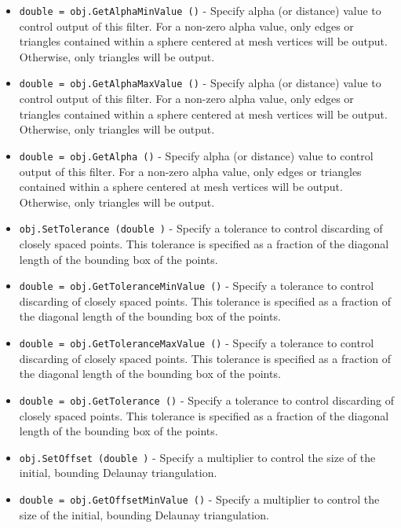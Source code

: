 \begin{itemize}
\item  \verb|double = obj.GetAlphaMinValue ()| -  Specify alpha (or distance) value to control output of this filter.
 For a non-zero alpha value, only edges or triangles contained within
 a sphere centered at mesh vertices will be output. Otherwise, only
 triangles will be output.

\item  \verb|double = obj.GetAlphaMaxValue ()| -  Specify alpha (or distance) value to control output of this filter.
 For a non-zero alpha value, only edges or triangles contained within
 a sphere centered at mesh vertices will be output. Otherwise, only
 triangles will be output.

\item  \verb|double = obj.GetAlpha ()| -  Specify alpha (or distance) value to control output of this filter.
 For a non-zero alpha value, only edges or triangles contained within
 a sphere centered at mesh vertices will be output. Otherwise, only
 triangles will be output.

\item  \verb|obj.SetTolerance (double )| -  Specify a tolerance to control discarding of closely spaced points.
 This tolerance is specified as a fraction of the diagonal length of
 the bounding box of the points.

\item  \verb|double = obj.GetToleranceMinValue ()| -  Specify a tolerance to control discarding of closely spaced points.
 This tolerance is specified as a fraction of the diagonal length of
 the bounding box of the points.

\item  \verb|double = obj.GetToleranceMaxValue ()| -  Specify a tolerance to control discarding of closely spaced points.
 This tolerance is specified as a fraction of the diagonal length of
 the bounding box of the points.

\item  \verb|double = obj.GetTolerance ()| -  Specify a tolerance to control discarding of closely spaced points.
 This tolerance is specified as a fraction of the diagonal length of
 the bounding box of the points.

\item  \verb|obj.SetOffset (double )| -  Specify a multiplier to control the size of the initial, bounding
 Delaunay triangulation.

\item  \verb|double = obj.GetOffsetMinValue ()| -  Specify a multiplier to control the size of the initial, bounding
 Delaunay triangulation.


\end{itemize}
